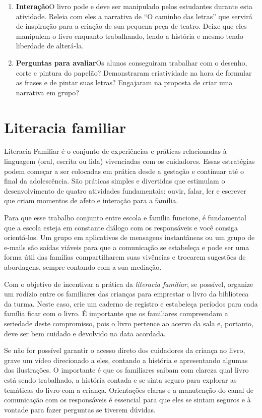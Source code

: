 \documentclass[11pt]{extarticle}
\begin{document}
\begin{enumerate}
\item \textbf{Interação}\quad O livro pode e deve ser 
manipulado pelos estudantes durante esta atividade. 
Releia com eles a narrativa de ``O caminho das letras'' que servirá
de inspiração para a criação de sua pequena peça de teatro. 
Deixe que eles manipulem o livro enquanto trabalhando, lendo
a história e mesmo tendo liberdade de alterá-la.

\item \textbf{Perguntas para avaliar}\quad Os alunos conseguiram trabalhar com 
o desenho, corte e pintura do papelão?
Demonstraram criatividade na hora de formular as frases e de pintar suas letras?
Engajaram na proposta de criar uma narrativa em grupo?
\end{enumerate}

\section{Literacia familiar}
Literacia Familiar é o conjunto de experiências e práticas relacionadas à linguagem (oral, escrita ou lida) vivenciadas com os cuidadores. Essas estratégias podem começar a ser colocadas em prática desde a gestação e continuar até o final da adolescência. São práticas simples e divertidas que estimulam o desenvolvimento de quatro atividades fundamentais: ouvir, falar, ler e escrever que criam momentos de afeto e interação para a família.

Para que esse trabalho conjunto entre escola e família funcione, é fundamental que a escola esteja em constante diálogo com os responsáveis e você consiga orientá-los. Um grupo em aplicativos de mensagens instantâneas ou um grupo de e-mails são saídas viáveis para que a comunicação se estabeleça e pode ser uma forma útil das famílias compartilharem suas vivências e trocarem sugestões de abordagens, sempre contando com a sua mediação.

Com o objetivo de incentivar a prática da \textit{literacia familiar}, se possível, organize um rodízio entre os familiares das crianças para emprestar o livro da biblioteca da turma. Neste caso, crie um caderno de registro e estabeleça períodos para cada família ficar com o livro. É importante que os familiares compreendam a seriedade deste compromisso, pois o livro pertence ao acervo da sala e, portanto, deve ser bem cuidado e devolvido na data acordada.

Se não for possível garantir o acesso direto dos cuidadores da criança ao livro, grave um vídeo direcionado a eles, contando a história e apresentando algumas das ilustrações. O importante é que os familiares saibam com clareza qual livro está sendo trabalhado, a história contada e se sinta seguro para explorar as temáticas do livro com a criança. Orientações claras e a manutenção do canal de comunicação com os responsáveis é essencial para que eles se sintam seguros e à vontade para fazer perguntas se tiverem dúvidas.
\end{document}
